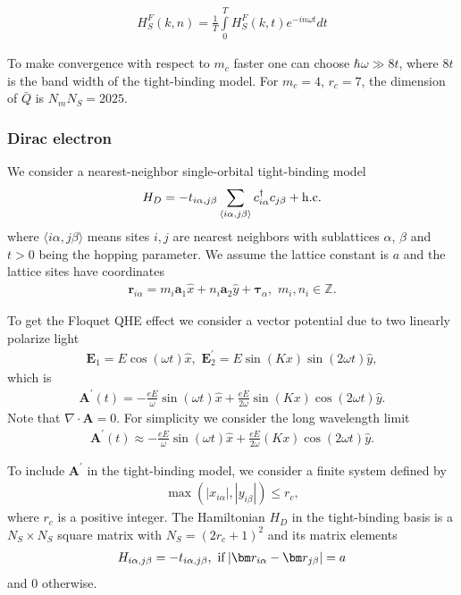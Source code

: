 \documentclass[aps,pra,preprint,showpacs]{revtex4-1}
\begin{document}
\begin{eqnarray}
	H_{S}^{F}(k,n)  =\frac{1}{T}
	{\displaystyle\int\limits_{0}^{T}}
	H_{S}^{F}(k,t)e^{-in\omega t}dt
\end{eqnarray}

To make convergence with respect to $m_c$ faster one can choose $\hbar \omega \gg 8t$, where $8t$ is the band width of the tight-binding model. For $m_c = 4$, $r_c = 7$, the dimension of $\bar{Q}$ is $N_m N_S = 2025$. 


\subsubsection{Dirac electron}
We consider a nearest-neighbor single-orbital tight-binding model
\begin{eqnarray}
	H_D = -t_{i\alpha,j\beta} \sum_{\langle i\alpha,j\beta \rangle} c_{i\alpha}^\dag c_{j\beta} + {\rm h.c.} 
\end{eqnarray}
where $\langle i\alpha,j\beta \rangle$ means sites $i, j$ are nearest neighbors with sublattices $\alpha$, $\beta$ and $t > 0$ being the hopping parameter. We assume the lattice constant is $a$ and the lattice sites have coordinates
\begin{eqnarray}
	\bm r_{i\alpha} = m_{i} \bm a_1 \hat{x} + n_{i} \bm a_2 \hat{y} + \bm \tau_{\alpha},\,\, m_{i}, n_{i} \in \mathbb{Z}.
\end{eqnarray} 

To get the Floquet QHE effect we consider a vector potential due to two linearly polarize light
\begin{eqnarray}
	\bm E_1 = E \cos(\omega t) \hat{x},\,\, \bm E_{2}^{\prime} = E\sin(Kx) \sin(2\omega t) \hat{y},
\end{eqnarray}
which is 
\begin{eqnarray}
	\bm A^{\prime} (t) = -\frac{eE}{\omega} \sin(\omega t) \hat{x} + \frac{eE}{2\omega} \sin(Kx) \cos(2\omega t) \hat{y}.
\end{eqnarray}
Note that $\nabla \cdot \bm A = 0$. For simplicity we consider the long wavelength limit
\begin{eqnarray}
	\bm A^{\prime} (t) \approx -\frac{eE}{\omega} \sin(\omega t) \hat{x} + \frac{eE}{2\omega} \left(K x\right) \cos(2\omega t) \hat{y}.
\end{eqnarray}

To include $\bm A^{\prime}$ in the tight-binding model, we consider a finite system defined by 
\begin{eqnarray}
	\max(|x_{i\alpha}|,|y_{i\beta}|)\le r_c,
\end{eqnarray}
where $r_c$ is a positive integer. The Hamiltonian $H_D$ in the tight-binding basis is a $N_S \times N_S$ square matrix with $N_S = (2r_c+1)^2$ and its matrix elements
\begin{eqnarray}
	H_{i\alpha,j\beta} = -t_{i\alpha,j\beta}, \,\, {\rm if }\, |\bm r_{i\alpha} -\bm r_{j\beta}| = a
\end{eqnarray}
and $0$ otherwise. 
\end{document}
